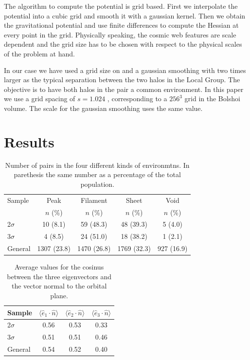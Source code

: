 \documentclass{emulateapj}
\newcommand{\hMpc}{{\ifmmode{h^{-1}{\rm Mpc}}\else{$h^{-1}$Mpc }\fi}}
\begin{document}
The algorithm to compute the potential is grid based. First we
interpolate the potential into a cubic grid and smooth it with a
gaussian kernel. Then we obtain the gravitational potential and use
finite differences to compute the Hessian at every point in the
grid. Physically speaking, the cosmic web features are scale
dependent and the grid size has to be chosen with respect to the
physical scales of the problem at hand.

In our case we have used a grid size on and a gaussian smoothing with
two times larger as the typical separation between the two
halos in the Local Group. The objective is to have both halos in the
pair a common environment. In this paper we use a grid spacing of
$s=1.024$ \hMpc, corresponding to a $256^3$ grid in the Bolshoi
volume. The scale for the gaussian smoothing uses the same value.





\section{Results}
\label{sec:results}

\citep{Hillier98}


\begin{table}
\begin{center}
\begin{tabular}{lcccc}\hline\hline
Sample & Peak & Filament & Sheet & Void\\
       & $n$ (\%) & $n$ (\%) & $n$ (\%) & $n$ (\%) \\\hline
2$\sigma$ & 10 (8.1) & 59 (48.3) & 48 (39.3) & 5 (4.0)\\  
3$\sigma$ & 4 (8.5) & 24 (51.0) &  18 (38.2) & 1 (2.1)\\
General & 1307 (23.8) & 1470 (26.8) & 1769 (32.3) & 927 (16.9)\\\hline
\end{tabular}
\caption{
Number of pairs in the four different kinds of environmtns. In
parethesis the same number as a percentage of the
total population. 
\label{table:models}}
\end{center}
\end{table}

\begin{table}
\begin{center}
\begin{tabular}{lccc}\hline\hline
Sample & $\langle\hat{e}_1\cdot \hat{n}\rangle$ & $\langle\hat{e}_2\cdot \hat{n}\rangle$ & $\langle\hat{e}_3\cdot \hat{n}\rangle$\\\hline
2$\sigma$ & 0.56 & 0.53 &  0.33\\
3$\sigma$ & 0.51 & 0.51 &  0.46\\
General & 0.54 & 0.52 & 0.40\\\hline
\end{tabular}
\caption{Average values for the cosinus between the three eigenvectors and the vector normal to the orbital plane.
\label{table:mu}}
\end{center}
\end{table}
\end{document}
